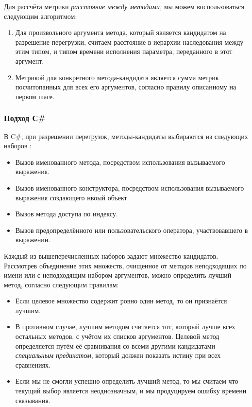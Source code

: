 Для рассчёта метрики \textit{расстояние между методами}, мы можем воспользоваться следующим алгоритмом:
\begin{enumerate}
    \item Для произвольного аргумента метода, который является кандидатом на разрешение перегрузки, считаем расстояние в иерархии наследования между этим типом, и типом времени исполнения параметра, переданного в этот аргумент.
    \item Метрикой для конкретного метода-кандидата является сумма метрик посчитопанных для всех его аргументов, согласно правилу описанному на первом шаге.
\end{enumerate}


\subsubsection{Подход С{\#}}

В C{\#}, при разрешении перегрузок, методы-кандидаты выбираются из следующих наборов \cite{csharp:languageSpecification}:

\begin{itemize}
    \item Вызов именованного метода, посредством использования вызываемого выражения.
    \item Вызов именованного конструктора, посредством использования вызываемого выражения создающего нвоый объект.
    \item Вызов метода доступа по индексу.
    \item Вызов предопределённого или пользовательского оператора, участвовавшего в выражении.
\end{itemize}

Каждый из вышеперечисленных наборов задают множество кандидатов. Рассмотрев объединение этих множеств, очищенное от методов неподходящих по имени или с неподходящим набором аргументов, можно определить лучший метод, согласно следующим правилам:

\begin{itemize}
    \item Если целевое множество содержит ровно один метод, то он признаётся лучшим.
    \item В противном случае, лучшим методом считается тот, который лучше всех остальных методов, с учётом их списков аргументов. Целевой метод определяется путём её сравнивания со всеми другими кандидатами \textit{специальным предикатом}, который должен показать истину при всех сравнениях.
    \item Если мы не смогли успешно определить лучший метод, то мы считаем что текущий выбор является неоднозначным, и мы продуцируем ошибку времени связывания.
\end{itemize}

